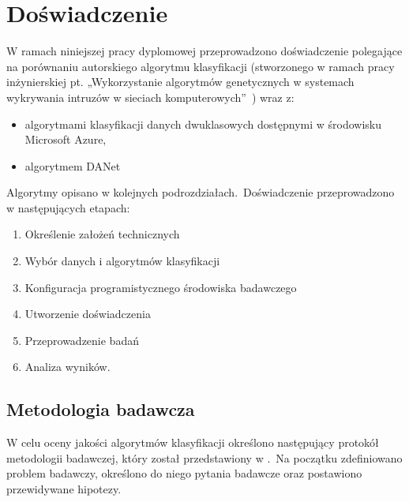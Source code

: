 \chapter{Doświadczenie}
\label{cha:dos}
W ramach niniejszej pracy dyplomowej przeprowadzono doświadczenie polegające na porównaniu autorskiego algorytmu klasyfikacji (stworzonego w ramach pracy inżynierskiej pt. „Wykorzystanie algorytmów genetycznych w systemach wykrywania intruzów w sieciach komputerowych”~\cite{Blyszcz2022}) wraz z:
\begin{itemize}
    \item algorytmami klasyfikacji danych dwuklasowych dostępnymi w środowisku Microsoft Azure,
    \item algorytmem DANet~\cite{Danet, Chen2022}
\end{itemize}
Algorytmy opisano w kolejnych podrozdziałach.\ Doświadczenie przeprowadzono w następujących etapach:
\begin{enumerate}
    \item Określenie założeń technicznych
    \item Wybór danych i algorytmów klasyfikacji
    \item Konfiguracja programistycznego środowiska badawczego
    \item Utworzenie doświadczenia
    \item Przeprowadzenie badań
    \item Analiza wyników.
\end{enumerate}


\section{Metodologia badawcza}
\label{sec:met}
W celu oceny jakości algorytmów klasyfikacji określono następujący protokół metodologii badawczej, który został przedstawiony w .\ Na początku zdefiniowano problem badawczy, określono do niego pytania badawcze oraz postawiono przewidywane hipotezy.

